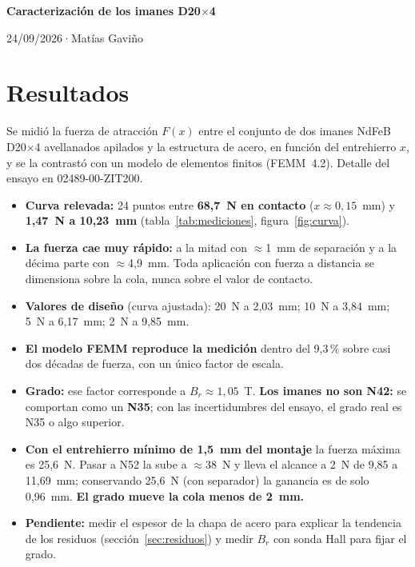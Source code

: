 \documentclass[11pt,a4paper]{article}
\newcommand{\titulo}{Caracterización de los imanes D20$\times$4}
\newcommand{\autor}{Matías Gaviño}
\newcommand{\fecha}{24/09/2026}                    %
\newcommand{\cabecera}{%
  \thispagestyle{fancy}%
  {\fontsize{20}{24}\selectfont\bfseries\titulo\par}%
  \vspace{5pt}%
  {\small\color{gris-medio}\fecha\quad·\quad\autor\par}%
  \vspace{6pt}}
\begin{document}
\cabecera

\section{Resultados}
Se midió la fuerza de atracción $F(x)$ entre el conjunto de dos imanes NdFeB D20$\times$4 avellanados
apilados y la estructura de acero, en función del entrehierro $x$, y se la contrastó con un modelo de
elementos finitos (FEMM~4.2). Detalle del ensayo en 02489-00-ZIT200.

\begin{itemize}
  \item \textbf{Curva relevada:} 24 puntos entre \textbf{68,7~N en contacto} ($x\approx0{,}15$~mm) y
        \textbf{1,47~N a 10,23~mm} (tabla~\ref{tab:mediciones}, figura~\ref{fig:curva}).
  \item \textbf{La fuerza cae muy rápido:} a la mitad con $\approx$1~mm de separación y a la décima parte
        con $\approx$4,9~mm. Toda aplicación con fuerza a distancia se dimensiona sobre la cola, nunca sobre
        el valor de contacto.
  \item \textbf{Valores de diseño} (curva ajustada): 20~N a 2,03~mm; 10~N a 3,84~mm; 5~N a 6,17~mm;
        2~N a 9,85~mm.
  \item \textbf{El modelo FEMM reproduce la medición} dentro del 9,3\,\% sobre casi dos décadas de fuerza,
        con un único factor de escala.
  \item \textbf{Grado:} ese factor corresponde a $B_r\approx1{,}05$~T. \textbf{Los imanes no son N42:} se
        comportan como un \textbf{N35}; con las incertidumbres del ensayo, el grado real es N35 o algo superior.
  \item \textbf{Con el entrehierro mínimo de 1,5~mm del montaje} la fuerza máxima es 25,6~N. Pasar a N52
        la sube a $\approx$38~N y lleva el alcance a 2~N de 9,85 a 11,69~mm; conservando 25,6~N (con
        separador) la ganancia es de solo 0,96~mm. \textbf{El grado mueve la cola menos de 2~mm.}
  \item \textbf{Pendiente:} medir el espesor de la chapa de acero para explicar la tendencia de los residuos
        (sección~\ref{sec:residuos}) y medir $B_r$ con sonda Hall para fijar el grado.
\end{itemize}
\end{document}
